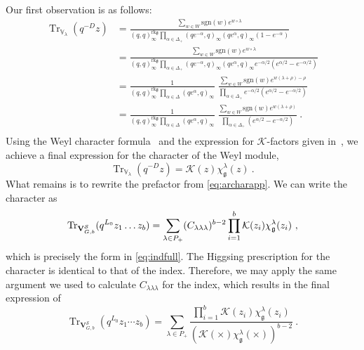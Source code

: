 \documentclass[a4paper]{article}
\def\KK{{\cal K}}
\def\SS{{\cal S}}
\def\Tr{\mathop{\mathrm{Tr}}\nolimits}
\def\gf{\mathfrak{g}}
\def\V{\mathbf{V}}
\begin{document}
Our first observation is as follows:
\begin{equation}\label{eq:rearr}
	\begin{split}
	\Tr_{\mathbb{V}_\lambda}(q^{-D}z) &= \frac{\sum_{w\in W} \mathrm{sgn}(w) e^{w \circ \lambda}}{(q,q)_\infty^{\mathrm{rk}\mathfrak{g}} \prod_{\alpha\in\Delta_+}(qe^{-\alpha},q)_\infty(qe^\alpha,q)_\infty (1-e^{-\alpha})} \\
	&= \frac{\sum_{w\in W} \mathrm{sgn}(w) e^{w \circ \lambda}}{(q,q)_\infty^{\mathrm{rk}\mathfrak{g}} \prod_{\alpha\in\Delta_+}(qe^{-\alpha},q)_\infty(qe^\alpha,q)_\infty e^{-\alpha/2}(e^{\alpha/2}-e^{-\alpha/2})} \\
	&= \frac{1}{(q,q)_\infty^{\mathrm{rk}\mathfrak{g}} \prod_{\alpha \in \Delta}(qe^\alpha,q)_\infty} \; \frac{\sum_{w\in W} \mathrm{sgn}(w) e^{w(\lambda+\rho)-\rho}}{\prod_{\alpha\in\Delta_+}e^{-\alpha/2}(e^{\alpha/2}-e^{-\alpha/2})} \\
	&= \frac{1}{(q,q)_\infty^{\mathrm{rk}\mathfrak{g}} \prod_{\alpha \in \Delta}(qe^\alpha,q)_\infty} \; \frac{\sum_{w\in W} \mathrm{sgn}(w) e^{w(\lambda+\rho)}}{\prod_{\alpha\in\Delta_+}(e^{\alpha/2}-e^{-\alpha/2})}~. \\
	\end{split}
\end{equation}
Using the Weyl character formula~\cite{Fulton:1991} and the expression for $\mathcal{K}$-factors given in~\cite{Lemos:2012ph}, we achieve a final expression for the character of the Weyl module,
\begin{equation}\label{eq:weylch}
	\Tr_{\mathbb{V}_{\lambda}} (q^{-D}z) = \mathcal{K}(z)\chi^\lambda_\mathfrak{g}(z)~.
\end{equation}
What remains is to rewrite the prefactor from \eqref{eq:archarapp}. We can write the character as
\begin{equation}
	\Tr_{\V^\SS_{G,b}}(q^{L_0}z_1\dots z_b) = \sum _{\lambda\in P_+}(C_{\lambda\lambda\lambda})^{b-2} \prod_{i=1}^b \KK(z_i)\chi_\gf^\lambda(z_i)~,
\end{equation}
which is precisely the form in \eqref{eq:indfull}. The Higgsing prescription for the character is identical to that of the index. Therefore, we may apply the same argument we used to calculate $C_{\lambda\lambda\lambda}$ for the index, which results in the final expression of
\begin{equation}\label{eq:append_indfinal}
	\Tr_{\mathbf{V}^\mathcal{S}_{G,b}}(q^{L_0}z_1\cdots z_b) = \sum_{\lambda\in P_+} \frac{\prod_{i=1}^{b}\mathcal{K}(z_i)\chi^\lambda_\mathfrak{g}(z_i)}{(\mathcal{K}(\times)\chi^\lambda_\mathfrak{g}(\times))^{b-2}}~.
\end{equation}
\end{document}
